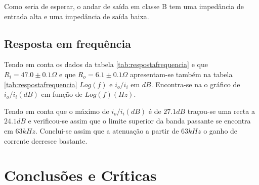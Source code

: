 \documentclass[%
  reprint,
  nofootinbib,
  amsmath,amssymb,
  aps,
  10pt,
  a4paper
]{revtex4-1}
\begin{document}
Como seria de esperar, o andar de saída em classe B tem uma impedância de entrada alta e uma impedância de saída baixa.



\subsection{Resposta em frequência}
Tendo em conta os dados da tabela \ref{tab:respostafrequencia} e que $R_i=47.0 \pm 0.1 \Omega$ e que $R_o=6.1 \pm 0.1 \Omega$ apresentam-se também na tabela \ref{tab:respostafrequencia} $Log(f)$ e $i_o / i_i $ em $dB$. Encontra-se na   o gráfico de $i_o/i_i (dB)$ em função de $Log(f) (Hz)$.

Tendo em conta que o máximo de  $i_o/i_i (dB)$ é de $27.1 dB$ traçou-se uma recta a $24.1 dB$ e verificou-se assim que o limite superior da banda passante se encontra em $63kHz$. Conclui-se assim que a atenuação a partir de $63kHz$ o ganho de corrente decresce bastante.



\section{Conclusões e Críticas}
\label{s:conclu}




\nocite{*}
{}
\end{document}
